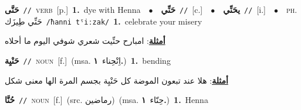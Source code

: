 \documentclass[10pt,a4paper,twoside]{article} %
\begin{document}
\begin{multicols}{2}
{\setlength\topsep{0pt}\textbf{\foreignlanguage{arabic}{حَنَّى}}\ {\color{gray}\texttt{//}\color{black}}\ \textsc{verb}\ [p.]\ \textbf{1.}~dye with Henna\ \ $\bullet$\ \ \setlength\topsep{0pt}\textbf{\foreignlanguage{arabic}{حَنِّي}}\ {\color{gray}\texttt{//}\color{black}}\ [c.]\ \ $\bullet$\ \ \setlength\topsep{0pt}\textbf{\foreignlanguage{arabic}{يحَنِّي}}\ {\color{gray}\texttt{//}\color{black}}\ [i.]\ \ $\bullet$\ \ \textsc{ph.} \color{gray} \foreignlanguage{arabic}{حَنِّي طِيزَك}\color{black}\ {\color{gray}\texttt{/{\sffamily ħanni tˤiːzak}/}\color{black}}\ \textbf{1.}~celebrate your misery\  \begin{flushright}\color{gray}\foreignlanguage{arabic}{\textbf{\underline{\foreignlanguage{arabic}{أمثلة}}}: امبارح حنِّيت شعري شوفي اليوم ما أحلاه}\end{flushright}\color{black}} \vspace{2mm}

{\setlength\topsep{0pt}\textbf{\foreignlanguage{arabic}{حَنْيِة}}\ {\color{gray}\texttt{//}\color{black}}\ \textsc{noun}\ [f.]\ \color{gray}(msa. \foreignlanguage{arabic}{اِنْحِناء}~\foreignlanguage{arabic}{\textbf{١.}})\color{black}\ \textbf{1.}~bending\  \begin{flushright}\color{gray}\foreignlanguage{arabic}{\textbf{\underline{\foreignlanguage{arabic}{أمثلة}}}: هلا عند تبعون الموضة كل حَنْيِة بجسم المرة الها معنى شكل}\end{flushright}\color{black}} \vspace{2mm}

{\setlength\topsep{0pt}\textbf{\foreignlanguage{arabic}{حُنَّا}}\ {\color{gray}\texttt{//}\color{black}}\ \textsc{noun}\ [f.]\ (src. \color{gray}\foreignlanguage{arabic}{رماضين}\color{black})\ \color{gray}(msa. \foreignlanguage{arabic}{حِنّاء}~\foreignlanguage{arabic}{\textbf{١.}})\color{black}\ \textbf{1.}~Henna\ } \vspace{2mm}


\end{multicols}
\end{document}
